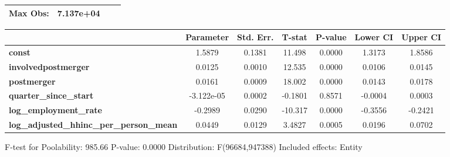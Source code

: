 \documentclass{report}
\begin{document}
\begin{center}
\begin{tabular}{lclc}
\textbf{Max Obs:}                                &      7.137e+04       & \textbf{                     }   &                  \\
\bottomrule
\end{tabular}
\begin{tabular}{lcccccc}
                                                 & \textbf{Parameter} & \textbf{Std. Err.} & \textbf{T-stat} & \textbf{P-value} & \textbf{Lower CI} & \textbf{Upper CI}  \\
\midrule
\textbf{const}                                   &       1.5879       &       0.1381       &      11.498     &      0.0000      &       1.3173      &       1.8586       \\
\textbf{involvedpostmerger}                      &       0.0125       &       0.0010       &      12.535     &      0.0000      &       0.0106      &       0.0145       \\
\textbf{postmerger}                              &       0.0161       &       0.0009       &      18.002     &      0.0000      &       0.0143      &       0.0178       \\
\textbf{quarter\_since\_start}                   &     -3.122e-05     &       0.0002       &     -0.1801     &      0.8571      &      -0.0004      &       0.0003       \\
\textbf{log\_employment\_rate}                   &      -0.2989       &       0.0290       &     -10.317     &      0.0000      &      -0.3556      &      -0.2421       \\
\textbf{log\_adjusted\_hhinc\_per\_person\_mean} &       0.0449       &       0.0129       &      3.4827     &      0.0005      &       0.0196      &       0.0702       \\
\bottomrule
\end{tabular}
\end{center}

F-test for Poolability: 985.66 \newline
 P-value: 0.0000 \newline
 Distribution: F(96684,947388) \newline
  \newline
 Included effects: Entity
\end{document}
